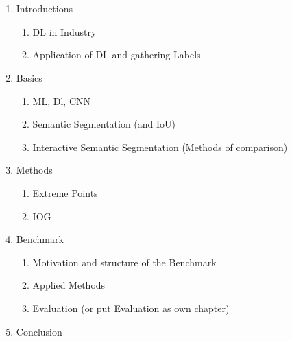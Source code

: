 \chapter{\abstractname}




\begin{enumerate}
	
	\item Introductions
	\begin{enumerate}
		\item DL in Industry
		\item Application of DL and gathering Labels
	\end{enumerate}
	
	\item Basics
	\begin{enumerate}
		\item ML, Dl, CNN
		\item Semantic Segmentation (and IoU)
		\item Interactive Semantic Segmentation (Methods of comparison)
	\end{enumerate}
	
	
	\item Methods
	\begin{enumerate}
		\item Extreme Points
		\item IOG
	\end{enumerate}
	
	
	\item Benchmark
	\begin{enumerate}
		\item Motivation and structure of the Benchmark
		\item Applied Methods
		\item Evaluation (or put Evaluation as own chapter)
	\end{enumerate}
	
	
	\item Conclusion
	
\end{enumerate}
